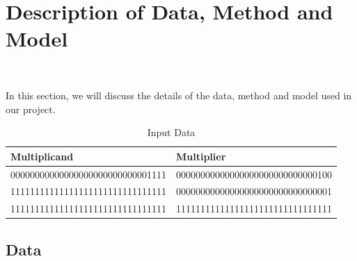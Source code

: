 \documentclass[twoside,twocolumn]{article}
\begin{document}

\section{Description of Data, Method and Model}~\label{sec:des}



In this section, we will discuss the details of the data, method and model used in our project.

\begin{table}
	\centering
	\begin{tabular}{l|l}
		\toprule
		\cmidrule(r){1-2}
		Multiplicand & Multiplier \\
		\hline
		00000000000000000000000000001111 & 00000000000000000000000000000100 \\
		11111111111111111111111111111111 & 00000000000000000000000000000001 \\
		11111111111111111111111111111111 & 11111111111111111111111111111111 \\
		\bottomrule
	\end{tabular}
	\caption{Input Data}
    \label{tab:input}
\end{table}

\subsection{Data}
\end{document}
